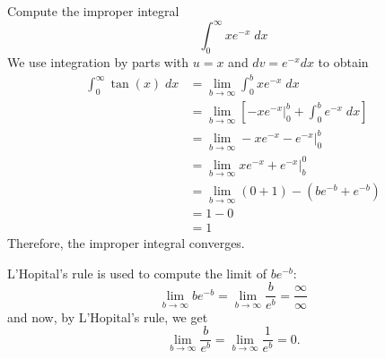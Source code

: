 \documentclass{ximera}
\begin{document}
\begin{example}[example 9]
Compute the improper integral
\[
\int_0^\infty xe^{-x} \; dx
\]
We use integration by parts with $u = x$ and $dv = e^{-x} dx$ to obtain
\begin{align*}
\int_0^\infty \tan(x) \; dx &= \lim_{b \to \infty} \int_0^b xe^{-x} \; dx\\
                                 &= \lim_{b \to \infty}  \left[ -xe^{-x}\bigg|_0^b + \int_0^b e^{-x} \; dx \right]   \\
                                 &= \lim_{b \to \infty}  -xe^{-x}- e^{-x}\bigg|_0^b  \\
                                 &= \lim_{b \to \infty}  xe^{-x} + e^{-x}\bigg|_b^0  \\
                                 &= \lim_{b \to \infty}  (0+1) - (be^{-b} + e^{-b})    \\
                                 &=  1 - 0  \\
                                 &= 1
\end{align*}
 Therefore, the improper integral converges.
 \begin{remark}
 L'Hopital's rule is used to compute the limit of $be^{-b}$:
 \[
 \lim_{b \to \infty} be^{-b} = \lim_{b \to \infty} \frac{b}{e^b} = \frac{\infty}{\infty}
 \]
 and now, by L'Hopital's rule, we get
 \[
 \lim_{b \to \infty} \frac{b}{e^b} = \lim_{b \to \infty} \frac{1}{e^b} = 0.
 \]
 \end{remark}
 
 \end{example}

                               
\begin{center}
\begin{foldable}
\end{foldable}
\end{center}
\end{document}
